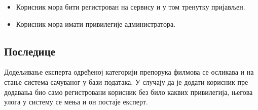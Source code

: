 \begin{itemize}
    \item Корисник мора бити регистрован на сервису и у том тренутку пријављен.
    \item Корисник мора имати привилегије администратора.
\end{itemize}

\subsection{Последице}

Додељивање експерта одређеној категорији препорука филмова се осликава и на стање система
сачуваног у бази података. У случају да је додати корисник пре додавања био само регистровани
корисник без било каквих привилегија, његова улога у систему се мења и он постаје експерт.
